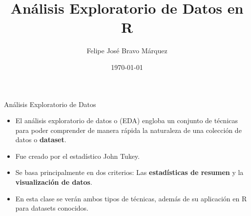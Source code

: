 \documentclass[handout]{beamer}
\title{Análisis Exploratorio de Datos en R}
\author[Felipe Bravo Márquez]{\footnotesize
 \textcolor[rgb]{0.00,0.00,1.00}{Felipe José Bravo Márquez}}
\date{ \today }
\begin{document}
\begin{frame}
\titlepage


\end{frame}





\begin{frame}{Análisis Exploratorio de Datos}
\scriptsize{
\begin{itemize}
 \item El análisis exploratorio de datos o (EDA) engloba un conjunto de técnicas para poder comprender de manera rápida la naturaleza de una colección de datos o \textbf{dataset}.
 
 \item Fue creado por el estadístico John Tukey.
 
 \item Se basa principalmente en dos criterios: Las \textbf{estadísticas de resumen} y la \textbf{visualización de datos}.
 
 \item En esta clase se verán ambos tipos de técnicas, además de su aplicación en R para datasets conocidos. 
\end{itemize}



}

\end{frame}
\end{document}

